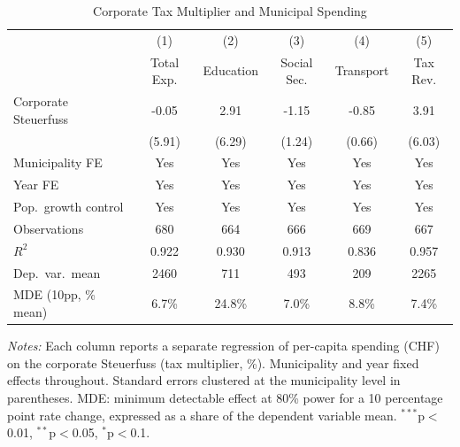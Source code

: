 \begin{table}[htbp]
\centering
\caption{Corporate Tax Multiplier and Municipal Spending}
\label{tab:main}
\begin{tabular}{lccccc}
\hline\hline
& (1) & (2) & (3) & (4) & (5) \\
& Total Exp. & Education & Social Sec. & Transport & Tax Rev. \\
\hline
Corporate Steuerfuss & -0.05 & 2.91 & -1.15 & -0.85 & 3.91 \\
& (5.91) & (6.29) & (1.24) & (0.66) & (6.03) \\
\hline
Municipality FE & Yes & Yes & Yes & Yes & Yes \\
Year FE & Yes & Yes & Yes & Yes & Yes \\
Pop.\ growth control & Yes & Yes & Yes & Yes & Yes \\
Observations & 680 & 664 & 666 & 669 & 667 \\
$R^2$ & 0.922 & 0.930 & 0.913 & 0.836 & 0.957 \\
Dep.\ var.\ mean & 2460 & 711 & 493 & 209 & 2265 \\
MDE (10pp, \% mean) & 6.7\% & 24.8\% & 7.0\% & 8.8\% & 7.4\% \\
\hline\hline
\end{tabular}
\begin{tablenotes}\small
\item \textit{Notes:} Each column reports a separate regression of per-capita spending (CHF) on the corporate Steuerfuss (tax multiplier, \%). Municipality and year fixed effects throughout. Standard errors clustered at the municipality level in parentheses. MDE: minimum detectable effect at 80\% power for a 10 percentage point rate change, expressed as a share of the dependent variable mean. $^{***}$p$<$0.01, $^{**}$p$<$0.05, $^{*}$p$<$0.1.
\end{tablenotes}
\end{table}
